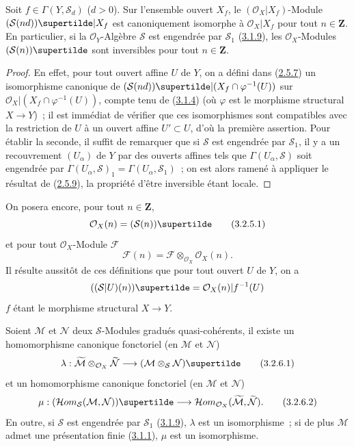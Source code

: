\begin{proposition}[3.2.5]
\label{II.3.2.5-fr}
Soit $f\in\Gamma(Y,\mathcal{S}_d)$ ($d>0$). Sur l'ensemble ouvert $X_f$, le
$(\mathcal{O}_X|X_f)$-Module
$(\mathcal{S}(nd))\supertilde|X_f$ est canoniquement isomorphe à
$\mathcal{O}_X|X_f$ pour tout $n\in\mathbf{Z}$. En particulier, si la
$\mathcal{O}_Y$-Algèbre $\mathcal{S}$ est engendrée par $\mathcal{S}_1$
\textup{(\hyperref[II.3.1.9-fr]{3.1.9})}, les $\mathcal{O}_X$-Modules
$(\mathcal{S}(n))\supertilde$ sont inversibles pour tout $n\in\mathbf{Z}$.
\end{proposition}

\begin{proof}
En effet, pour tout ouvert affine $U$ de $Y$, on a défini dans
(\hyperref[II.2.5.7-fr]{2.5.7}) un isomorphisme canonique de
$(\mathcal{S}(nd))\supertilde|(X_f\cap\varphi^{-1}(U))$ sur
$\mathcal{O}_X|(X_f\cap\varphi^{-1}(U))$, compte tenu de
(\hyperref[II.3.1.4-fr]{3.1.4}) (où $\varphi$ est le morphisme structural
$X\to Y$)~; il est immédiat de vérifier que ces isomorphismes sont compatibles
avec la restriction de $U$ à un ouvert affine $U'\subset U$, d'où la première
assertion. Pour établir la seconde, il suffit de remarquer que si
$\mathcal{S}$ est engendrée par $\mathcal{S}_1$, il y a un recouvrement
$(U_\alpha)$ de $Y$ par des ouverts affines tels que
$\Gamma(U_\alpha,\mathcal{S})$ soit engendrée par
$\Gamma(U_\alpha,\mathcal{S})_1=\Gamma(U_\alpha,\mathcal{S}_1)$~; on est alors
ramené à appliquer le résultat de (\hyperref[II.2.5.9-fr]{2.5.9}), la
propriété d'être inversible étant locale.
\end{proof}

On posera encore, pour tout $n\in\mathbf{Z}$,
\[
\label{II.3.2.5.1-fr}
  \mathcal{O}_X(n)=(\mathcal{S}(n))\supertilde
\tag{3.2.5.1}
\]
et pour tout $\mathcal{O}_X$-Module $\mathcal{F}$
\[
\label{II.3.2.5.2-fr}
  \mathcal{F}(n)=\mathcal{F}\otimes_{\mathcal{O}_X}\mathcal{O}_X(n).
\tag{3.2.5.2}
\]
Il résulte aussitôt de ces définitions que pour tout ouvert $U$ de $Y$, on a
\[
  ((\mathcal{S}|U)(n))\supertilde
  =\mathcal{O}_X(n)|f^{-1}(U)
\]
$f$ étant le morphisme structural $X\to Y$.

\begin{proposition}[3.2.6]
\label{II.3.2.6-fr}
Soient $\mathcal{M}$ et $\mathcal{N}$ deux $\mathcal{S}$-Modules gradués
quasi-cohérents, il existe un homomorphisme canonique fonctoriel (en
$\mathcal{M}$ et $\mathcal{N}$)
\[
\label{II.3.2.6.1-fr}
  \lambda:\widetilde{\mathcal{M}}
  \otimes_{\mathcal{O}_X}\widetilde{\mathcal{N}}
  \longrightarrow(\mathcal{M}\otimes_{\mathcal{S}}\mathcal{N})\supertilde
\tag{3.2.6.1}
\]
et un homomorphisme canonique fonctoriel (en $\mathcal{M}$ et
$\mathcal{N}$)
\[
\label{II.3.2.6.2-fr}
  \mu:(\mathcal{H}om_{\mathcal{S}}(\mathcal{M},\mathcal{N}))\supertilde
  \longrightarrow
  \mathcal{H}om_{\mathcal{O}_X}
  (\widetilde{\mathcal{M}},\widetilde{\mathcal{N}}).
\tag{3.2.6.2}
\]
En outre, si $\mathcal{S}$ est engendrée par $\mathcal{S}_1$
\textup{(\hyperref[II.3.1.9-fr]{3.1.9})}, $\lambda$ est un isomorphisme~; si de plus
$\mathcal{M}$ admet une présentation finie
\textup{(\hyperref[II.3.1.1-fr]{3.1.1})}, $\mu$ est un isomorphisme.
\end{proposition}

